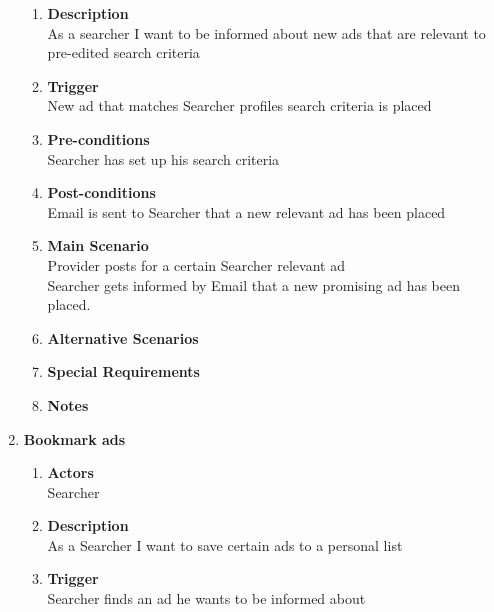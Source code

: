 \documentclass{scrreprt}
\begin{document}
\begin{enumerate}
\begin{enumerate}
		\item \textbf{Description} \\
			As a searcher I want to be informed about new ads that are relevant to pre-edited search criteria\\
			
		\item \textbf{Trigger} \\
			New ad that matches Searcher profiles search criteria is placed\\

		\item \textbf{Pre-conditions} \\
			Searcher has set up his search criteria\\

		\item \textbf{Post-conditions} \\
			Email is sent to Searcher that a new relevant ad has been placed\\

		\item \textbf{Main Scenario} \\
			Provider posts for a certain Searcher relevant ad\\
			Searcher gets informed by Email that a new promising ad has been placed.\\

		\item \textbf{Alternative Scenarios} \\

		\item \textbf{Special Requirements} \\

		\item \textbf{Notes} \\
	\end{enumerate}

	\item \textbf{Bookmark ads}
	\begin{enumerate}
		\item \textbf{Actors}  \\
			Searcher\\

		\item \textbf{Description} \\
			As a Searcher I want to save certain ads to a personal list\\
			
		\item \textbf{Trigger} \\
			Searcher finds an ad he wants to be informed about\\


\end{enumerate}
\end{enumerate}
\end{document}
